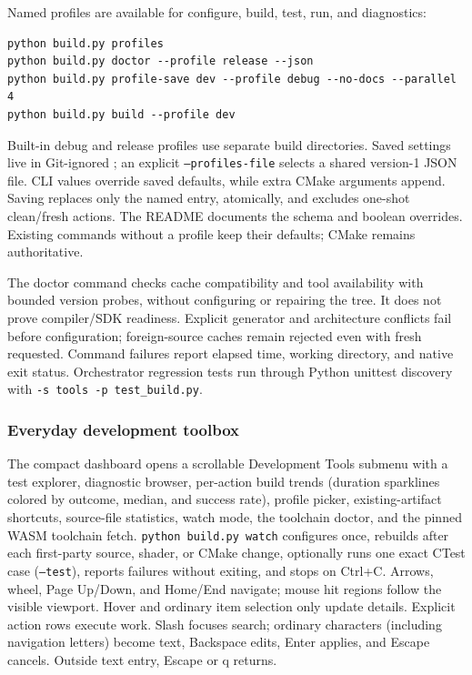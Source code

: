 Named profiles are available for configure, build, test, run, and diagnostics:
\begin{lstlisting}[language={}]
python build.py profiles
python build.py doctor --profile release --json
python build.py profile-save dev --profile debug --no-docs --parallel 4
python build.py build --profile dev
\end{lstlisting}
Built-in debug and release profiles use separate build directories. Saved
settings live in Git-ignored ; an explicit
\texttt{--profiles-file} selects a shared version-1 JSON file. CLI values override
saved defaults, while extra CMake arguments append. Saving replaces only the
named entry, atomically, and excludes one-shot clean/fresh actions. The README
documents the schema and boolean overrides. Existing commands without a profile
keep their defaults; CMake remains authoritative.

The doctor command checks cache compatibility and tool availability with bounded
version probes, without configuring or repairing the tree. It does not prove
compiler/SDK readiness. Explicit generator and architecture conflicts fail before
configuration; foreign-source caches remain rejected even with fresh requested.
Command failures report elapsed time, working directory, and native exit status.
Orchestrator regression tests run through Python unittest discovery with
\texttt{-s tools -p test\_build.py}.

\subsubsection{Everyday development toolbox}
The compact dashboard opens a scrollable Development Tools submenu with a
test explorer, diagnostic browser, per-action build trends (duration sparklines
colored by outcome, median, and success rate), profile picker,
existing-artifact shortcuts, source-file statistics, watch mode, the toolchain
doctor, and the pinned WASM toolchain fetch. \texttt{python build.py watch}
configures once, rebuilds after each first-party source, shader, or CMake
change, optionally runs one exact CTest case (\texttt{--test}), reports
failures without exiting, and stops on Ctrl+C. Arrows, wheel, Page Up/Down, and Home/End navigate;
mouse hit regions follow the visible viewport. Hover and ordinary item selection
only update details. Explicit action rows execute work. Slash focuses search;
ordinary characters (including navigation letters) become text, Backspace edits,
Enter applies, and Escape cancels. Outside text entry, Escape or q returns.

